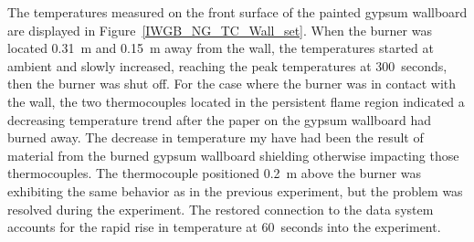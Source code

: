 \documentclass[twoside]{uocthesis}
\begin{document}
{The temperatures measured on the front surface of the painted gypsum wallboard are displayed in Figure~\ref{IWGB_NG_TC_Wall_set}.  When the burner was located 0.31~m and 0.15~m away from the wall, the temperatures started at ambient and slowly increased, reaching the peak temperatures at 300~seconds, then the burner was shut off.  For the case where the burner was in contact with the wall, the two thermocouples located in the persistent flame region indicated a decreasing temperature trend after the paper on the gypsum wallboard had burned away.  The decrease in temperature my have had been the result of material from the burned gypsum wallboard shielding otherwise impacting those thermocouples. The thermocouple positioned 0.2~m above the burner was exhibiting the same behavior as in the previous experiment, but the problem was resolved during the experiment.  The restored connection to the data system accounts for the rapid rise in temperature at 60~seconds into the experiment.  

}
\end{document}

